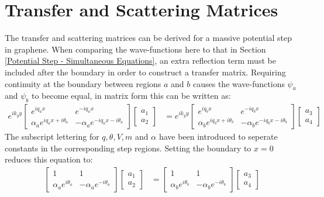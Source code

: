 		\section{Transfer and Scattering Matrices}
		\label{Potential Step - Transfer and Scattering Matrices}
		The transfer and scattering matrices can be derived for a massive potential step in graphene. When comparing the wave-functions here to that in Section \ref{Potential Step - Simultaneous Equations}, an extra reflection term must be included after the boundary in order to construct a transfer matrix. Requiring continuity at the boundary between regions $a$ and $b$ causes the wave-functions $\psi_{a}$ and $\psi_{b}$ to become equal, in matrix form this can be written as:
		\begin{align}
			e^{ik_{y}y}
			\left[\begin{array}{ccc}
				e^{iq_{a}x}&e^{-iq_{a}x}\\
				\alpha_{a}e^{iq_{a}x+i\theta_{a}}&-\alpha_{a}e^{-iq_{a}x-i\theta_{a}}
			\end{array}\right]
			\left[\begin{array}{ccc}
				a_{1}\\
				a_{2}
			\end{array}\right]
			&=
			e^{ik_{y}y}
			\left[\begin{array}{ccc}
				e^{iq_{b}x}&e^{-iq_{b}x}\\
				\alpha_{b}e^{iq_{b}x+i\theta_{b}}&-\alpha_{b}e^{-iq_{b}x-i\theta_{b}}
			\end{array}\right]
			\left[\begin{array}{ccc}
				a_{3}\\
				a_{4}
			\end{array}\right]
		\end{align}
		The subscript lettering for $q, \theta, V, m$ and $\alpha$ have been introduced to seperate constants in the corresponding step regions. Setting the boundary to $x=0$ reduces this equation to:
		\begin{align}
			\left[\begin{array}{ccc}
				1&1\\
				\alpha_{a}e^{i\theta_{a}}&-\alpha_{a}e^{-i\theta_{a}}
			\end{array}\right]
			\left[\begin{array}{ccc}
				a_{1}\\
				a_{2}
			\end{array}\right]
			&=
			\left[\begin{array}{ccc}
				1&1\\
				\alpha_{b}e^{i\theta_{b}}&-\alpha_{b}e^{-i\theta_{b}}
			\end{array}\right]
			\left[\begin{array}{ccc}
				a_{3}\\
				a_{4}
			\end{array}\right]
		\end{align}
